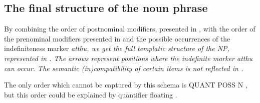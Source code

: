 \subsection{The final structure of the noun phrase}\label{sec:nppp:Thefinalstructureofthenounphrase}

By combining the order of postnominal modifiers, presented in   , with the order of the prenominal modifiers presented in  and the possible occurrences of the indefiniteness marker \em atthu\em, we get the full templatic structure of the NP, represented in  . The arrows represent positions where the indefinite marker \em atthu \em can occur. The semantic (in)compatibility of certain items is not reflected in .


The only order which cannot be captured by this schema is QUANT POSS N , but this order could be explained by quantifier floating .

